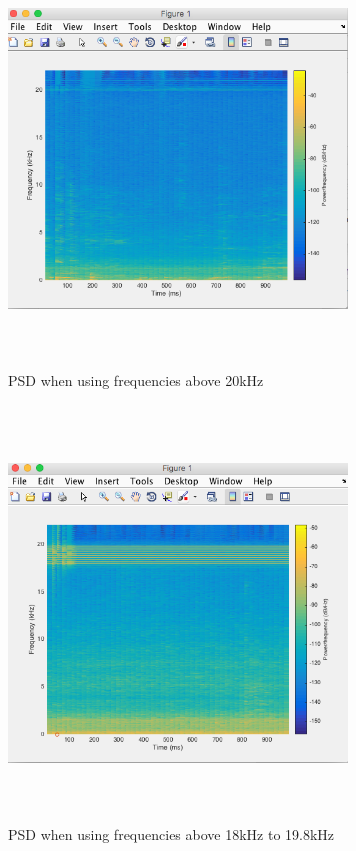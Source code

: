 \documentclass{acm_proc_article-sp}
\begin{document}
\begin{figure}[h]
\caption{PSD when using frequencies above 20kHz}
\includegraphics[width=9cm, height=11cm]{above20}
\end{figure}

\begin{figure}[h]
\caption{PSD when using frequencies above 18kHz to 19.8kHz}
\includegraphics[width=9cm, height=11cm]{Below20}
\end{figure}
\end{document}
